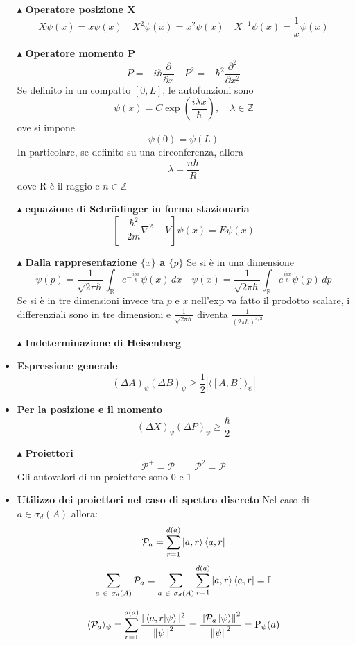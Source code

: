 \documentclass{book}
\newcommand{\g}{\textbf}
\newcommand{\e}{\begin{equation}}
\newcommand{\ex}{\end{equation} }
\renewcommand{\it}{\item[$\cdot$]}
\begin{document}
\begin{multicols}{4}
\begin{itemize}
    \item [$\blacktriangle$] \g{Operatore posizione X}
        \e{X\psi(x) = x\psi(x) \quad X^2\psi(x) = x^2\psi(x) \quad X^{-1}\psi(x) = \frac{1}{x} \psi(x)} \ex


\item [$\blacktriangle$] \g{Operatore momento P}
        \e{P = -i\hbar \frac{\partial}{\partial x} \quad P^2 = -\hbar^2 \frac{\partial^2}{\partial x^2}} \ex
    Se definito in un compatto $[0, L]$, le autofunzioni sono
        \e{\psi(x) = C \exp\left(\frac{i\lambda x}{\hbar}\right), \quad \lambda \in \mathbb{Z}} \ex
    ove si impone
        \e{\psi(0) = \psi(L)} \ex
    In particolare, se definito su una circonferenza, allora 
    \e {\lambda = \frac{n \hbar }{R}} \ex
    dove R è il raggio e $n \in \mathbb{Z}$
    \item[$\blacktriangle$] \g{equazione di Schrödinger in forma stazionaria}
        \e{\left[-\frac{\hbar^2}{2m} \nabla^2 + V\right] \psi(x) = E\psi(x)} \ex

 \item [$\blacktriangle$] \g{Dalla rappresentazione $\{x\}$ a $\{p\}$}
    Se si è in una dimensione
        \e{\tilde{\psi}(p) = \frac{1}{\sqrt{2\pi \hbar} }\int_{\mathbb{R}} e^{-\frac{ipx}{ \hbar}} \psi(x) \, dx \quad \psi(x) = \frac{1}{\sqrt{2\pi \hbar} }\int_{\mathbb{R}} e^{\frac{ipx}{\hbar}} \tilde{\psi}(p) \, dp} \ex
    Se si è in tre dimensioni invece tra $p$ e $x$ nell'exp va fatto il prodotto scalare, i differenziali sono in tre dimensioni e $\frac{1}{\sqrt{2 \pi \hbar}}$ diventa $\frac{1}{\left(2 \pi \hbar \right)^{3/2}}$
\item [$\blacktriangle$] \g{Indeterminazione di Heisenberg}
    \it \g{Espressione generale}
        \e{(\Delta A)_\psi (\Delta B)_\psi \geq \frac{1}{2}\left|{\langle [A, B] \rangle_\psi} \right|} \ex
        \it \g{Per la posizione e il momento}
        \e{(\Delta X)_{\psi}(\Delta P)_{\psi} \geq \frac{\hbar}{2}}\ex

\item [$\blacktriangle$] \g{Proiettori}
\e{\mathcal{P}^{+} = \mathcal{P} \qquad \mathcal{P}^{2} = \mathcal{P}}\ex
Gli autovalori di un proiettore sono 0 e 1 
\it \g{Utilizzo dei proiettori nel caso di spettro discreto}
Nel caso di $a \in \sigma_{d}(A)$ allora:
\e{\mathcal{P}_{a} = \sum_{r=1}^{d(a)}\ket{a,r}\bra{a,r}}\ex
\e{\sum_{a \ \in \ \sigma_{d}(A)}\mathcal{P}_{a} = \sum_{a \ \in \ \sigma_{d}(A)} \sum_{r = 1}^{d(a)}\ket{a,r}\bra{a,r} = \mathbb{I}}\ex

\e{\langle \mathcal{P}_{a} \rangle_{\psi} = \sum_{r=1}^{d(a)}\frac{|\braket{a,r}{\psi}|^{2}}{\norm{\psi}^{2}} = \frac{\norm{\mathcal{P}_{a}\ket{\psi}}^{2}}{\norm{\psi}^{2}} = \text{P}_{\psi}(a)}\ex


\end{itemize}
\end{multicols}
\end{document}
